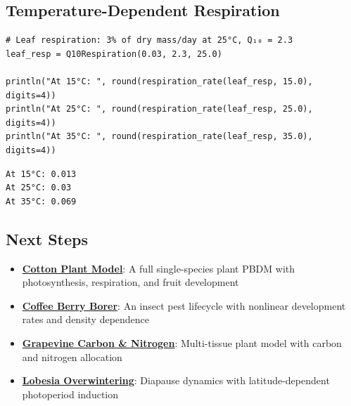 \subsection{Temperature-Dependent Respiration}



\label{15405737351669705365}{}



\begin{verbatim}
# Leaf respiration: 3% of dry mass/day at 25°C, Q₁₀ = 2.3
leaf_resp = Q10Respiration(0.03, 2.3, 25.0)

println("At 15°C: ", round(respiration_rate(leaf_resp, 15.0), digits=4))
println("At 25°C: ", round(respiration_rate(leaf_resp, 25.0), digits=4))
println("At 35°C: ", round(respiration_rate(leaf_resp, 35.0), digits=4))
\end{verbatim}




\begin{verbatim}
At 15°C: 0.013
At 25°C: 0.03
At 35°C: 0.069
\end{verbatim}



\subsection{Next Steps}



\label{1533082578090870617}{}


\begin{itemize}
\item \textbf{\href{tutorials/02\_cotton\_plant.md}{Cotton Plant Model}}: A full single-species plant PBDM with photosynthesis, respiration, and fruit development


\item \textbf{\href{tutorials/03\_coffee\_berry\_borer.md}{Coffee Berry Borer}}: An insect pest lifecycle with nonlinear development rates and density dependence


\item \textbf{\href{tutorials/04\_grapevine.md}{Grapevine Carbon \& Nitrogen}}: Multi-tissue plant model with carbon and nitrogen allocation


\item \textbf{\href{tutorials/05\_lobesia\_overwintering.md}{Lobesia Overwintering}}: Diapause dynamics with latitude-dependent photoperiod induction

\end{itemize}


